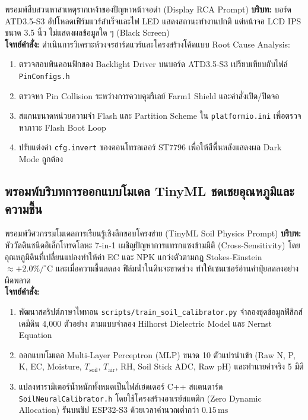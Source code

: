 \begin{promptbox}{พรอมพ์สืบสวนหาสาเหตุรากเหง้าของปัญหาหน้าจอดำ (Display RCA Prompt)}
\small
\textbf{บริบท:} บอร์ด ATD3.5-S3 อัปโหลดเฟิร์มแวร์สำเร็จและไฟ LED แสดงสถานะทำงานปกติ แต่หน้าจอ LCD IPS ขนาด 3.5 นิ้ว ไม่แสดงผลข้อมูลใด ๆ (Black Screen) \\
\textbf{โจทย์คำสั่ง:} ดำเนินการวิเคราะห์วงจรฮาร์ดแวร์และโครงสร้างโค้ดแบบ Root Cause Analysis:
\begin{enumerate}[leftmargin=15pt, itemsep=1pt]
    \item ตรวจสอบพินคอนฟิกของ Backlight Driver บนบอร์ด ATD3.5-S3 เปรียบเทียบกับไฟล์ \texttt{PinConfigs.h}
    \item ตรวจหา Pin Collision ระหว่างการควบคุมรีเลย์ Farm1 Shield และคำสั่งเปิด/ปิดจอ
    \item สแกนขนาดหน่วยความจำ Flash และ Partition Scheme ใน \texttt{platformio.ini} เพื่อตรวจหาภาวะ Flash Boot Loop
    \item ปรับแต่งค่า \texttt{cfg.invert} ของคอนโทรลเลอร์ ST7796 เพื่อให้สีพื้นหลังแสดงผล Dark Mode ถูกต้อง
\end{enumerate}
\end{promptbox}

\subsection{พรอมพ์บริบทการออกแบบโมเดล TinyML ชดเชยอุณหภูมิและความชื้น}

\begin{promptbox}{พรอมพ์วิศวกรรมโมเดลการเรียนรู้เชิงลึกขอบโครงข่าย (TinyML Soil Physics Prompt)}
\small
\textbf{บริบท:} หัววัดดินชนิดอิเล็กโทรดโลหะ 7-in-1 เผชิญปัญหาการแทรกแซงข้ามมิติ (Cross-Sensitivity) โดยอุณหภูมิดินที่เปลี่ยนแปลงทำให้ค่า EC และ NPK แกว่งตัวตามกฎ Stokes-Einstein $\approx +2.0\%/^\circ\text{C}$ และเมื่อความชื้นลดลง ฟิล์มน้ำในดินจะขาดช่วง ทำให้เซนเซอร์อ่านค่าปุ๋ยลดลงอย่างผิดพลาด \\
\textbf{โจทย์คำสั่ง:}
\begin{enumerate}[leftmargin=15pt, itemsep=1pt]
    \item พัฒนาสคริปต์ภาษาไพทอน \texttt{scripts/train\_soil\_calibrator.py} จำลองชุดข้อมูลฟิสิกส์เคมีดิน 4,000 ตัวอย่าง ตามแบบจำลอง Hilhorst Dielectric Model และ Nernst Equation
    \item ออกแบบโมเดล Multi-Layer Perceptron (MLP) ขนาด 10 ตัวแปรนำเข้า (Raw N, P, K, EC, Moisture, $T_{\text{soil}}$, $T_{\text{air}}$, $\text{RH}$, Soil Stick ADC, Raw pH) และทำนายค่าจริง 5 มิติ
    \item แปลงพารามิเตอร์น้ำหนักทั้งหมดเป็นไฟล์เฮดเดอร์ C++ สแตนดาร์ด \texttt{SoilNeuralCalibrator.h} โดยใช้โครงสร้างอาเรย์สแตติก (Zero Dynamic Allocation) รันบนชิป ESP32-S3 ด้วยเวลาคำนวณต่ำกว่า $0.15\,\text{ms}$
\end{enumerate}
\end{promptbox}

